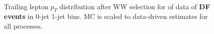\begin{figure}[!hbtp]
\centering
{}
\\
\caption{Trailing lepton $p_T$ distribution after WW selection for \intlumiEightTeV of data 
of {\bf DF events} in 0-jet  1-jet  bins. 
MC is scaled to data-driven estimates for all processes.} 
\label{fig:ww_ptmin}
\end{figure}

